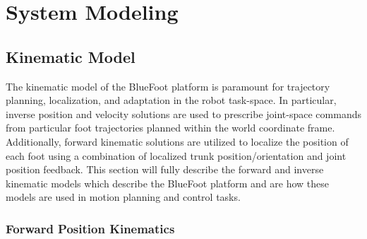 \chapter{System Modeling}
\label{ch::system_modeling}

	
	\section{Kinematic Model}
	\label{sec::system_kinematics}

		The kinematic model of the BlueFoot platform is paramount for trajectory planning, localization, and adaptation in the robot task-space. In particular, inverse position and velocity solutions are used to prescribe joint-space commands from particular foot trajectories planned within the world coordinate frame. Additionally, forward kinematic solutions are utilized to localize the position of each foot using a combination of localized trunk position/orientation and joint position feedback. This section will fully describe the forward and inverse kinematic models which describe the BlueFoot platform and are how these models are used in motion planning and control tasks.

		\subsection{Forward Position Kinematics}
		\label{ch::system_modeling_pos_kin}

